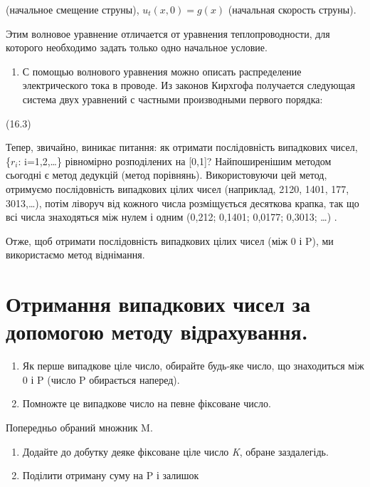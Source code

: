 \documentclass[
  ukrainian,
]{article}
\providecommand{\tightlist}{%
  \setlength{\itemsep}{0pt}\setlength{\parskip}{0pt}}
\begin{document}
(начальное смещение струны), \(u_t(x, 0) = g(x)\) (начальная скорость
струны).

Этим волновое уравнение отличается от уравнения теплопроводности, для
которого необходимо задать только одно начальное условие.

\begin{enumerate}
\def\labelenumi{\arabic{enumi}.}
\setcounter{enumi}{3}
\tightlist
\item
  С помощью волнового уравнения можно описать распределение
  электрического тока в проводе. Из законов Кирхгофа получается
  следующая система двух уравнений с частными производными первого
  порядка:
\end{enumerate}

(16.3)

Тепер, звичайно, виникає питання: як отримати послідовність випадкових
чисел, \{\(r_i\): i=1,2,\ldots\} рівномірно розподілених на {[}0,1{]}?
Найпоширенішим методом сьогодні є метод дедукцій (метод порівнянь).
Використовуючи цей метод, отримуємо послідовність випадкових цілих чисел
(наприклад, 2120, 1401, 177, 3013,\ldots), потім ліворуч від кожного
числа розміщується десяткова крапка, так що всі числа знаходяться між
нулем і одним (0,212; 0,1401; 0,0177; 0,3013; \ldots) .

Отже, щоб отримати послідовність випадкових цілих чисел (між 0 і P), ми
використаємо метод віднімання.

\section{Отримання випадкових чисел за допомогою методу
відрахування.}\label{ux43eux442ux440ux438ux43cux430ux43dux43dux44f-ux432ux438ux43fux430ux434ux43aux43eux432ux438ux445-ux447ux438ux441ux435ux43b-ux437ux430-ux434ux43eux43fux43eux43cux43eux433ux43eux44e-ux43cux435ux442ux43eux434ux443-ux432ux456ux434ux440ux430ux445ux443ux432ux430ux43dux43dux44f.}

\begin{enumerate}
\def\labelenumi{\arabic{enumi}.}
\item
  Як перше випадкове ціле число, обирайте будь-яке число, що знаходиться
  між 0 і P (число P обирається наперед).
\item
  Помножте це випадкове число на певне фіксоване число.
\end{enumerate}

Попередньо обраний множник M.

\begin{enumerate}
\def\labelenumi{\arabic{enumi}.}
\setcounter{enumi}{2}
\item
  Додайте до добутку деяке фіксоване ціле число \emph{K}, обране
  заздалегідь.
\item
  Поділити отриману суму на P і залишок
\end{enumerate}
\end{document}
